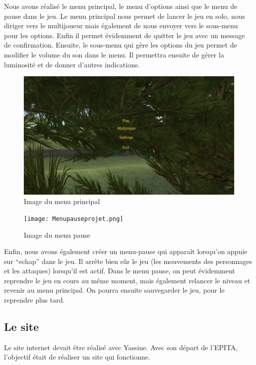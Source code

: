 \documentclass[a4paper, 12pt]{article}
\begin{document}
	\par Nous avons réalisé le menu principal, le menu d’options ainsi que le menu de pause dans le jeu. Le menu principal nous permet de lancer le jeu en solo, nous diriger vers le multijoueur mais également de nous envoyer vers le sous-menu pour les options. Enfin il permet évidemment de quitter le jeu avec un message de confirmation.
Ensuite, le sous-menu qui gère les options du jeu permet de modifier le volume du son dans le menu. Il permettra ensuite de gérer la luminosité et de donner d’autres indications.
\newpage
	\begin{figure}[!ht]
		\centerline{\includegraphics[scale=0.3]{Menuprojet.png}}
		\caption*{Image du menu principal}		
	\end{figure}
	\begin{figure}[!ht]
		\centerline{\texttt{[image: Menupauseprojet.png]}}
		\caption*{Image du menu pause}
	\end{figure}
	
	\par Enfin, nous avons également créer un menu-pause qui apparaît lorsqu’on appuie sur “echap” dans le jeu. Il arrête bien sûr le jeu (les mouvements des personnages et les attaques) lorsqu’il est actif. Dans le menu pause, on peut évidemment reprendre le jeu en cours au même moment, mais également relancer le niveau et revenir au menu principal. On pourra ensuite sauvegarder le jeu, pour le reprendre plus tard.

	\subsection{Le site}
	 Le site internet devait être réalisé avec Yassine. Avec son départ de l’EPITA, l’objectif était de réaliser un site qui fonctionne. 
	 
\end{document}
